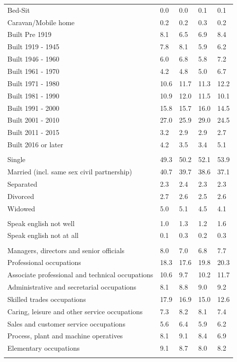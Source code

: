 \documentclass{article}
\begin{document}
\begin{table}[h]
\begin{tabular}{KTTTT}
Bed-Sit & 0.0& 0.0& 0.1& 0.1\\
Caravan/Mobile home & 0.2& 0.2& 0.3& 0.2\\
    \hline
Built Pre 1919 & 8.1& 6.5& 6.9& 8.4\\
Built 1919 - 1945 & 7.8& 8.1& 5.9& 6.2\\
Built  1946 - 1960 & 6.0& 6.8& 5.8& 7.2\\
Built  1961 - 1970 & 4.2& 4.8& 5.0& 6.7\\
Built  1971 - 1980 & 10.6& 11.7& 11.3& 12.2\\
Built  1981 - 1990 & 10.9& 12.0& 11.5& 10.1\\
Built  1991 - 2000 & 15.8& 15.7& 16.0& 14.5\\
Built  2001 - 2010 & 27.0& 25.9& 29.0& 24.5\\
Built  2011 - 2015 & 3.2& 2.9& 2.9& 2.7\\
Built  2016 or later & 4.2& 3.5& 3.4& 5.1\\
\hline
    \\
    \hline
Single & 49.3& 50.2& 52.1& 53.9\\
Married (incl. same sex civil partnership) & 40.7& 39.7& 38.6& 37.1\\
Separated  & 2.3& 2.4& 2.3& 2.3\\
Divorced  & 2.7& 2.6& 2.5& 2.6\\
Widowed & 5.0& 5.1& 4.5& 4.1\\
\hline
    \\ 
    \hline
Speak english not well & 1.0& 1.3& 1.2& 1.6\\
Speak english not at all & 0.1& 0.3& 0.2& 0.3\\
\hline
    \\
    \hline
Managers, directors and senior officials & 8.0& 7.0& 6.8& 7.7\\
Professional occupations & 18.3& 17.6& 19.8& 20.3\\
Associate professional and technical occupations & 10.6&  9.7& 10.2& 11.7\\
Administrative and secretarial occupations & 8.1& 8.8& 9.0& 9.2\\
Skilled trades occupations & 17.9& 16.9& 15.0& 12.6\\
Caring, leisure and other service occupations & 7.3& 8.2& 8.1& 7.4\\
Sales and customer service occupations & 5.6& 6.4& 5.9& 6.2\\
Process, plant and machine operatives & 8.1& 9.1& 8.4& 6.9\\
Elementary occupations & 9.1& 8.7& 8.0& 8.2\\
\hline
\end{tabular}
\end{table}
\end{document}
